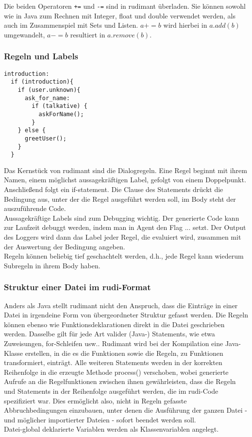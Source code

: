 Die beiden Operatoren \texttt{+=} und \texttt{-=} sind in rudimant überladen. Sie können sowohl wie in Java zum Rechnen mit Integer, float und double verwendet werden, als auch im Zusammenspiel mit Sets und Listen. $ a += b $ wird hierbei in $ a.add(b) $ umgewandelt, $ a-= b $ resultiert in $ a.remove(b) $.
  
\subsubsection{Regeln und Labels}

\begin{verbatim}
introduction:
  if (introduction){
    if (user.unknown){
      ask_for_name:
        if (talkative) {
          askForName();
        }
    } else {
      greetUser();
    }
  }
\end{verbatim}

Das Kernstück von rudimant sind die Dialogregeln. Eine Regel beginnt mit ihrem Namen, einem möglichst aussagekräftigen Label, gefolgt von einem Doppelpunkt. Anschließend folgt ein if-statement. Die Clause des Statements drückt die Bedingung aus, unter der die Regel ausgeführt werden soll, im Body steht der auszuführende Code.\\
Aussagekräftige Labels sind zum Debugging wichtig. Der generierte Code kann zur Laufzeit debuggt werden, indem man in Agent den Flag ... setzt. Der Output des Loggers wird dann das Label jeder Regel, die evaluiert wird, zusammen mit der Auswertung der Bedingung angeben.\\
Regeln können beliebig tief geschachtelt werden, d.h., jede Regel kann wiederum Subregeln in ihrem Body haben.


\subsubsection{Struktur einer Datei im rudi-Format}

Anders als Java stellt rudimant nicht den Anspruch, dass die Einträge in einer Datei in irgendeine Form von übergeordneter Struktur gefasst werden. Die Regeln können ebenso wie Funktionsdeklarationen direkt in die Datei geschrieben werden. Dasselbe gilt für jede Art valider (Java-) Statements, wie etwa Zuweisungen, for-Schleifen usw.. Rudimant wird bei der Kompilation eine Java-Klasse erstellen, in die es die Funktionen sowie die Regeln, zu Funktionen transformiert, einträgt. Alle weiteren Statements werden in der korrekten Reihenfolge in die erzeugte Methode process() verschoben, wobei generierte Aufrufe an die Regelfunktionen zwischen ihnen gewährleisten, dass die Regeln und Statements in der Reihenfolge ausgeführt werden, die im rudi-Code spezifiziert war. Dies ermöglicht also, nicht in Regeln gefasste Abbruchbedingungen einzubauen, unter denen die Ausführung der ganzen Datei - und möglicher importierter Dateien - sofort beendet werden soll.\\
Datei-global deklarierte Variablen werden als Klassenvariablen angelegt.

